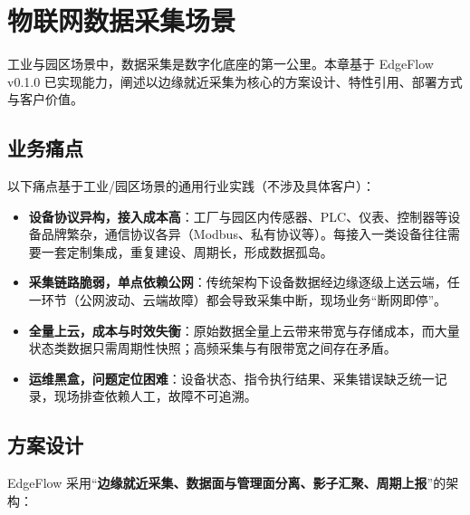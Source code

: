 \chapter{物联网数据采集场景}

工业与园区场景中，数据采集是数字化底座的第一公里。本章基于 EdgeFlow v0.1.0 已实现能力，阐述以边缘就近采集为核心的方案设计、特性引用、部署方式与客户价值。

\section{业务痛点}

以下痛点基于工业/园区场景的通用行业实践（不涉及具体客户）：

\begin{itemize}
  \item \textbf{设备协议异构，接入成本高}：工厂与园区内传感器、PLC、仪表、控制器等设备品牌繁杂，通信协议各异（Modbus、私有协议等）。每接入一类设备往往需要一套定制集成，重复建设、周期长，形成数据孤岛。
  \item \textbf{采集链路脆弱，单点依赖公网}：传统架构下设备数据经边缘逐级上送云端，任一环节（公网波动、云端故障）都会导致采集中断，现场业务“断网即停”。
  \item \textbf{全量上云，成本与时效失衡}：原始数据全量上云带来带宽与存储成本，而大量状态类数据只需周期性快照；高频采集与有限带宽之间存在矛盾。
  \item \textbf{运维黑盒，问题定位困难}：设备状态、指令执行结果、采集错误缺乏统一记录，现场排查依赖人工，故障不可追溯。
\end{itemize}

\section{方案设计}

EdgeFlow 采用“\textbf{边缘就近采集、数据面与管理面分离、影子汇聚、周期上报}”的架构：

